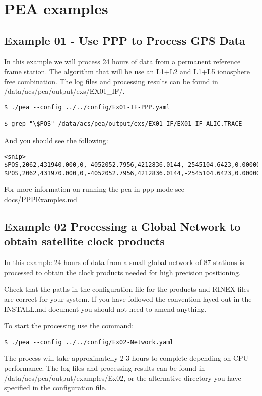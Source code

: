 \chapter{PEA examples}
\label{ch:pea_examples}


\section{Example 01 - Use PPP to Process GPS Data}
In this example we will process 24 hours of data from a permanent reference frame station. The algorithm that will be use an L1+L2 and L1+L5 ionosphere free combination. The log files and processing results can be found in /data/acs/pea/output/exs/EX01\_IF/.

\begin{verbatim}
$ ./pea --config ../../config/Ex01-IF-PPP.yaml

$ grep "\$POS" /data/acs/pea/output/exs/EX01_IF/EX01_IF-ALIC.TRACE
\end{verbatim}

And you should see the following: 
\begin{verbatim}
<snip> $POS,2062,431940.000,0,-4052052.7956,4212836.0144,-2545104.6423,0.00000043966020,0.00000039738502,0.00000013421476 $POS,2062,431970.000,0,-4052052.7956,4212836.0144,-2545104.6423,0.00000043965772,0.00000039738393,0.00000013421667
\end{verbatim}

For more information on running the pea in ppp mode see docs/PPPExamples.md

\section{Example 02 Processing a Global Network to obtain satellite clock products}
In this example 24 hours of data from a small global network of 87 stations is processed to obtain the clock products needed for high precision positioning.

Check that the paths in the configuration file for the products and RINEX files are correct for your system. If you have followed the convention layed out in the INSTALL.md document you should not need to amend anything.

To start the processing use the command:
\begin{verbatim}
$ ./pea --config ../../config/Ex02-Network.yaml
\end{verbatim}
The process will take approximatelly 2-3 hours to complete depending on CPU performance. The log files and processing results can be found in /data/acs/pea/output/examples/Ex02, or the alternative directory you have specified in the configuration file.

